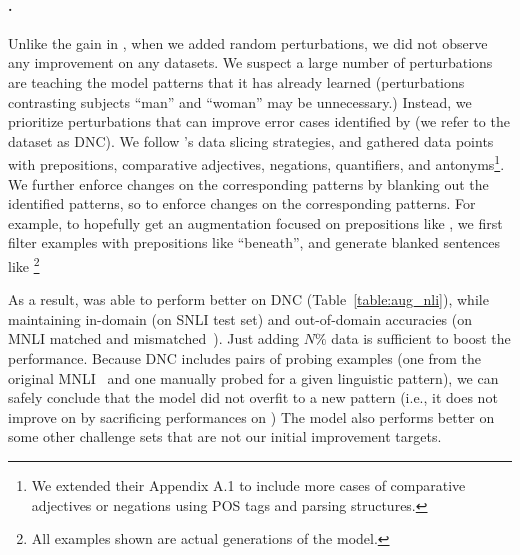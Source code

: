 \paragraph{\nli.}
Unlike the gain in \sst, when we added random perturbations, we did not observe any improvement on any datasets.
We suspect a large number of perturbations are teaching the model patterns that it has already learned (\eg perturbations contrasting subjects ``man'' and ``woman'' may be unnecessary.) 
Instead, we prioritize perturbations that can improve error cases identified by \citet{kim2019probing} (we refer to the dataset as DNC).
We follow \citet{chen2019slice}'s data slicing strategies, and gathered data points with prepositions, comparative adjectives, negations, quantifiers, and antonyms\footnote{We extended their Appendix A.1 to include more cases of \eg comparative adjectives or negations using POS tags and parsing structures.}.
We further enforce changes on the corresponding patterns by blanking out the identified patterns, so to enforce changes on the corresponding patterns.
For example, to hopefully get an augmentation focused on prepositions like , we first filter examples with prepositions like ``beneath'', and generate blanked sentences like 
\footnote{All examples shown are actual generations of the model. }

As a result, \maug was able to perform better on DNC (Table~\ref{table:aug_nli}), while maintaining in-domain (on SNLI test set) and out-of-domain accuracies (on MNLI matched and mismatched~\cite{}).
Just adding $N\%$ data is sufficient to boost the performance.%
Because DNC includes pairs of probing examples (one from the original MNLI~\cite{} and one manually probed for a given linguistic pattern), we can safely conclude that the model did not overfit to a new pattern (i.e., it does not improve on  by sacrificing performances on )
The model also performs better on some other challenge sets that are not our initial improvement targets.


